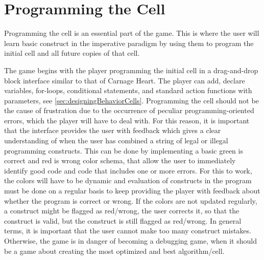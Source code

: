 \section{Programming the Cell}

Programming the cell is an essential part of the game. This is where the user will learn basic construct in the imperative paradigm by using them to program the initial cell and all future copies of that cell.\newline

The game begins with the player programming the initial cell in a drag-and-drop block interface similar to that of Carnage Heart.
The player can add, declare variables, for-loops, conditional statements, and standard action functions with parameters, see \autoref{sec:designingBehaviorCells}.
Programming the cell should not be the cause of frustration due to the occurrence of peculiar programming-oriented errors, which the player will have to deal with.
For this reason, it is important that the interface provides the user with feedback which gives a clear understanding of when the user has combined a string of legal or illegal programming constructs.
This can be done by implementing a basic green is correct and red is wrong color schema, that allow the user to immediately identify good code and code that includes one or more errors.
For this to work, the colors will have to be dynamic and evaluation of constructs in the program must be done on a regular basis to keep providing the player with feedback about whether the program is correct or wrong.
If the colors are not updated regularly, a construct might be flagged as red/wrong, the user corrects it, so that the construct is valid, but the construct is still flagged as red/wrong.
In general terms, it is important that the user cannot make too many construct mistakes.
Otherwise, the game is in danger of becoming a debugging game, when it should be a game about creating the most optimized and best algorithm/cell.